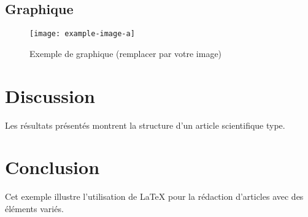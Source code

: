 \documentclass{article}
\begin{document}
\subsection{Graphique}

\begin{figure}[H]
    \centering
    \texttt{[image: example-image-a]}
    \caption{Exemple de graphique (remplacer par votre image)}
\end{figure}

\section{Discussion}

Les résultats présentés montrent la structure d'un article scientifique type.

\section{Conclusion}

Cet exemple illustre l'utilisation de LaTeX pour la rédaction d'articles avec des éléments variés.
\end{document}
